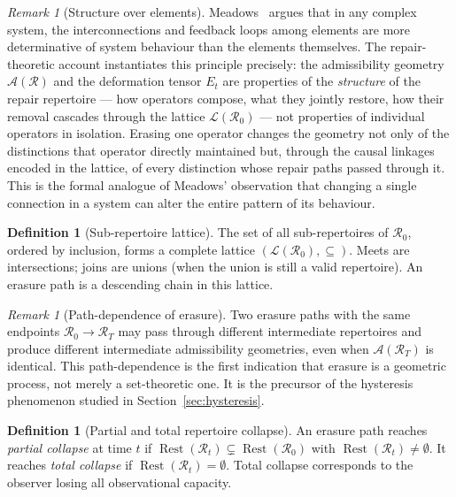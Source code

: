 \documentclass[12pt, oneside]{article}
\theoremstyle{plain}
\theoremstyle{definition}
\newtheorem{definition}[theorem]{Definition}
\theoremstyle{remark}
\newtheorem{remark}[theorem]{Remark}
\DeclareMathOperator{\Rest}{Rest}
\newcommand{\AO}{\mathcal{A}}
\newcommand{\Rt}{\mathcal{R}_t}
\newcommand{\Rzero}{\mathcal{R}_0}
\newcommand{\Restzero}{\Rest(\Rzero)}
\newcommand{\Et}{E_t}
\begin{document}
\begin{remark}[Structure over elements]
  Meadows~\cite{Meadows2008} argues that in any complex system,
  the interconnections and feedback loops among elements are more
  determinative of system behaviour than the elements themselves.
  The repair-theoretic account instantiates this principle
  precisely: the admissibility geometry $\AO(\mathcal{R})$ and
  the deformation tensor $\Et$ are properties of the
  \emph{structure} of the repair repertoire --- how operators
  compose, what they jointly restore, how their removal cascades
  through the lattice $\mathcal{L}(\Rzero)$ --- not properties
  of individual operators in isolation.
  Erasing one operator changes the geometry not only of the
  distinctions that operator directly maintained but, through
  the causal linkages encoded in the lattice, of every
  distinction whose repair paths passed through it.
  This is the formal analogue of Meadows' observation that
  changing a single connection in a system can alter the
  entire pattern of its behaviour.
\end{remark}

\begin{definition}[Sub-repertoire lattice]
  The set of all sub-repertoires of $\Rzero$, ordered by inclusion,
  forms a complete lattice $(\mathcal{L}(\Rzero), \subseteq)$.
  Meets are intersections; joins are unions (when the union is still
  a valid repertoire).
  An erasure path is a descending chain in this lattice.
\end{definition}

\begin{remark}[Path-dependence of erasure]
  Two erasure paths with the same endpoints
  $\Rzero \to \mathcal{R}_T$ may pass through different intermediate
  repertoires and produce different intermediate admissibility
  geometries, even when $\AO(\mathcal{R}_T)$ is identical.
  This path-dependence is the first indication that erasure is a
  geometric process, not merely a set-theoretic one.
  It is the precursor of the hysteresis phenomenon studied in
  Section~\ref{sec:hysteresis}.
\end{remark}

\begin{definition}[Partial and total repertoire collapse]
  An erasure path reaches \emph{partial collapse} at time $t$ if
  $\Rest(\Rt) \subsetneq \Restzero$ with $\Rest(\Rt) \neq \emptyset$.
  It reaches \emph{total collapse} if $\Rest(\Rt) = \emptyset$.
  Total collapse corresponds to the observer losing all observational
  capacity.
\end{definition}
\end{document}
